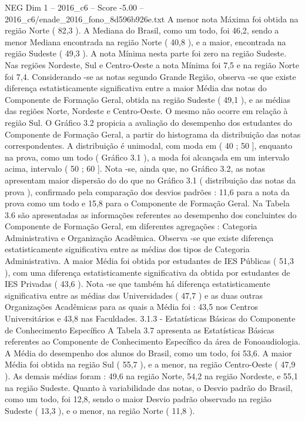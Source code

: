 \begin{textsample}{NEG Dim 1 – 2016\_c6 – Score -5.00 – 2016\_c6/enade\_2016\_fono\_8d596b926e.txt}
A menor nota Máxima foi obtida na região Norte ( 82,3 ).
A Mediana do Brasil, como um todo, foi 46,2, sendo a menor Mediana encontrada na região Norte ( 40,8 ), e a maior, encontrada na região Sudeste ( 49,3 ).
A nota Mínima nesta parte foi zero na região Sudeste.
Nas regiões Nordeste, Sul e Centro-Oeste a nota Mínima foi 7,5 e na região Norte foi 7,4.
Considerando -se as notas segundo Grande Região, observa -se que existe diferença estatisticamente significativa entre a maior Média das notas do Componente de Formação Geral, obtida na região Sudeste ( 49,1 ), e as médias das regiões Norte, Nordeste e Centro-Oeste.
O mesmo não ocorre em relação à região Sul.
O Gráfico 3.2 propicia a avaliação do desempenho dos estudantes do Componente de Formação Geral, a partir do histograma da distribuição das notas correspondentes.
A distribuição é unimodal, com moda em ( 40 ; 50 ], enquanto na prova, como um todo ( Gráfico 3.1 ), a moda foi alcançada em um intervalo acima, intervalo ( 50 ; 60 ].
Nota -se, ainda que, no Gráfico 3.2, as notas apresentam maior dispersão do do que no Gráfico 3.1 ( distribuição das notas da prova ), confirmado pela comparação dos desvios padrões : 11,6 para a nota da prova como um todo e 15,8 para o Componente de Formação Geral.
Na Tabela 3.6 são apresentadas as informações referentes ao desempenho dos concluintes do Componente de Formação Geral, em diferentes agregações : Categoria Administrativa e Organização Acadêmica.
Observa -se que existe diferença estatisticamente significativa entre as médias dos tipos de Categoria Administrativa.
A maior Média foi obtida por estudantes de IES Públicas ( 51,3 ), com uma diferença estatisticamente significativa da obtida por estudantes de IES Privadas ( 43,6 ).
Nota -se que também há diferença estatisticamente significativa entre as médias das Universidades ( 47,7 ) e as duas outras Organizações Acadêmicas para as quais a Média foi : 43,5 nos Centros Universitários e 43,8 nas Faculdades. 3.1.3 - Estatísticas Básicas do Componente de Conhecimento Específico A Tabela 3.7 apresenta as Estatísticas Básicas referentes ao Componente de Conhecimento Específico da área de Fonoaudiologia.
A Média do desempenho dos alunos do Brasil, como um todo, foi 53,6.
A maior Média foi obtida na região Sul ( 55,7 ), e a menor, na região Centro-Oeste ( 47,9 ).
As demais médias foram : 49,6 na região Norte, 54,2 na região Nordeste, e 55,1 na região Sudeste.
Quanto à variabilidade das notas, o Desvio padrão do Brasil, como um todo, foi 12,8, sendo o maior Desvio padrão observado na região Sudeste ( 13,3 ), e o menor, na região Norte ( 11,8 ).

\end{textsample}
